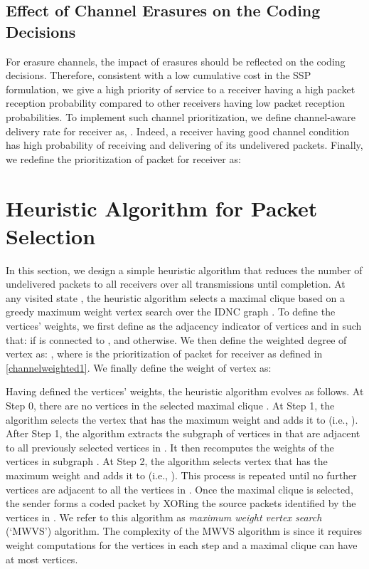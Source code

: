 \documentclass[12pt, peerreview, onecolumn]{IEEEtran}
\begin{document}
\vspace{-5mm}
\subsection{Effect of  Channel Erasures  on the Coding Decisions}
For erasure channels,  the impact of  erasures should be reflected on the coding decisions. Therefore,  consistent with a low cumulative cost in the SSP formulation, we  give  a high priority of service  to  a receiver having a high packet reception probability compared to other receivers having low packet reception probabilities. To implement such channel prioritization, we define channel-aware delivery rate for receiver  as, . Indeed, a receiver having good channel condition has high probability of receiving  and delivering  of its undelivered packets. Finally, we redefine the  prioritization of packet  for receiver  as:


\vspace{-5mm}
\section{Heuristic Algorithm for Packet Selection} \label{heuristic}
In this section, we  design a simple  heuristic algorithm that reduces the  number of undelivered packets to all receivers over all transmissions until completion. At any visited state ,  the heuristic algorithm selects a maximal clique  based on a greedy  maximum weight vertex search over the IDNC graph .  To define the vertices' weights, we first define  as the adjacency indicator of vertices  and  in  such that:   if  is connected to ,  and   otherwise.
We then define the weighted degree  of  vertex   as: , where  is the prioritization of packet  for receiver  as defined in \eqref{channelweighted1}.   We finally define  the weight  of vertex  as:


Having defined the vertices' weights,  the heuristic algorithm evolves  as follows. At Step 0,  there are no  vertices in the selected maximal clique . At Step 1, the algorithm selects the vertex  that has the maximum weight  and adds it to  (i.e., ). After Step 1, the algorithm extracts the subgraph  of vertices in  that are adjacent to all previously selected vertices in . It then recomputes the weights of the vertices in subgraph . At Step 2, the algorithm selects vertex  that has the maximum weight  and adds it to  (i.e., ). This process is repeated until no further vertices are adjacent to all the  vertices  in . Once the maximal clique is selected, the sender forms  a coded packet by XORing the source packets identified by the vertices in . We refer to this algorithm as \emph{maximum weight vertex search} (`MWVS') algorithm. The  complexity of  the  MWVS algorithm is  since it requires weight computations for the  vertices  in each step and  a maximal clique can have at most  vertices. 
\end{document}
